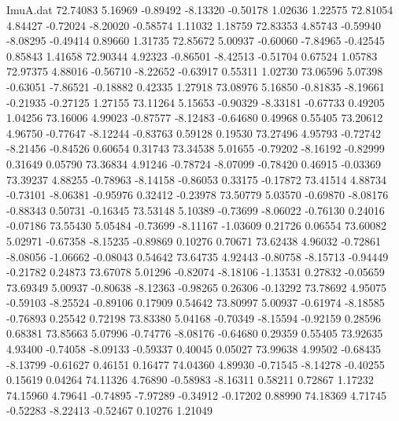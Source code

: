 \begin{filecontents}{ImuA.dat}
  72.74083    5.16969   -0.89492   -8.13320   -0.50178    1.02636    1.22575
  72.81054    4.84427   -0.72024   -8.20020   -0.58574    1.11032    1.18759
  72.83353    4.85743   -0.59940   -8.08295   -0.49414    0.89660    1.31735
  72.85672    5.00937   -0.60060   -7.84965   -0.42545    0.85843    1.41658
  72.90344    4.92323   -0.86501   -8.42513   -0.51704    0.67524    1.05783
  72.97375    4.88016   -0.56710   -8.22652   -0.63917    0.55311    1.02730
  73.06596    5.07398   -0.63051   -7.86521   -0.18882    0.42335    1.27918
  73.08976    5.16850   -0.81835   -8.19661   -0.21935   -0.27125    1.27155
  73.11264    5.15653   -0.90329   -8.33181   -0.67733    0.49205    1.04256
  73.16006    4.99023   -0.87577   -8.12483   -0.64680    0.49968    0.55405
  73.20612    4.96750   -0.77647   -8.12244   -0.83763    0.59128    0.19530
  73.27496    4.95793   -0.72742   -8.21456   -0.84526    0.60654    0.31743
  73.34538    5.01655   -0.79202   -8.16192   -0.82999    0.31649    0.05790
  73.36834    4.91246   -0.78724   -8.07099   -0.78420    0.46915   -0.03369
  73.39237    4.88255   -0.78963   -8.14158   -0.86053    0.33175   -0.17872
  73.41514    4.88734   -0.73101   -8.06381   -0.95976    0.32412   -0.23978
  73.50779    5.03570   -0.69870   -8.08176   -0.88343    0.50731   -0.16345
  73.53148    5.10389   -0.73699   -8.06022   -0.76130    0.24016   -0.07186
  73.55430    5.05484   -0.73699   -8.11167   -1.03609    0.21726    0.06554
  73.60082    5.02971   -0.67358   -8.15235   -0.89869    0.10276    0.70671
  73.62438    4.96032   -0.72861   -8.08056   -1.06662   -0.08043    0.54642
  73.64735    4.92443   -0.80758   -8.15713   -0.94449   -0.21782    0.24873
  73.67078    5.01296   -0.82074   -8.18106   -1.13531    0.27832   -0.05659
  73.69349    5.00937   -0.80638   -8.12363   -0.98265    0.26306   -0.13292
  73.78692    4.95075   -0.59103   -8.25524   -0.89106    0.17909    0.54642
  73.80997    5.00937   -0.61974   -8.18585   -0.76893    0.25542    0.72198
  73.83380    5.04168   -0.70349   -8.15594   -0.92159    0.28596    0.68381
  73.85663    5.07996   -0.74776   -8.08176   -0.64680    0.29359    0.55405
  73.92635    4.93400   -0.74058   -8.09133   -0.59337    0.40045    0.05027
  73.99638    4.99502   -0.68435   -8.13799   -0.61627    0.46151    0.16477
  74.04360    4.89930   -0.71545   -8.14278   -0.40255    0.15619    0.04264
  74.11326    4.76890   -0.58983   -8.16311    0.58211    0.72867    1.17232
  74.15960    4.79641   -0.74895   -7.97289   -0.34912   -0.17202    0.88990
  74.18369    4.71745   -0.52283   -8.22413   -0.52467    0.10276    1.21049

\end{filecontents}
